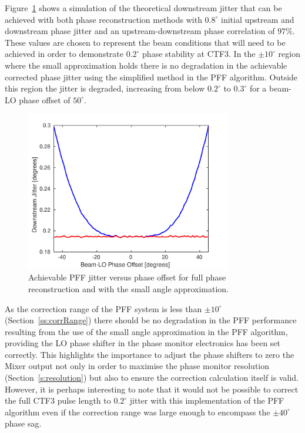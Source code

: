 Figure~\ref{f:phaseRecJitSim} shows a simulation of the theoretical downstream jitter that can be achieved with both phase reconstruction methods with \(0.8^\circ\) initial upstream and downstream phase jitter and an upstream-downstream phase correlation of \(97\%\). These values are chosen to represent the beam conditions that will need to be achieved in order to demonstrate \(0.2^\circ\) phase stability at CTF3. In the \(\pm10^\circ\) region where the small approximation holds there is no degradation in the achievable corrected phase jitter using the simplified method in the PFF algorithm. Outside this region the jitter is degraded, increasing from below \(0.2^\circ\) to \(0.3^\circ\) for a beam-LO phase offset of \(50^\circ\). 

\begin{figure}
  \centering
  \includegraphics[width=0.8\textwidth]{Figures/commissioning/phaseRecJitSim}
  \caption{Achievable PFF jitter versus phase offset for full phase reconstruction and with the small angle approximation.}
  \label{f:phaseRecJitSim}
\end{figure}

As the correction range of the PFF system is less than \(\pm10^\circ\) (Section~\ref{ss:corrRange}) there should be no degradation in the PFF performance resulting from the use of the small angle approximation in the PFF algorithm, providing the LO phase shifter in the phase monitor electronics has been set correctly. This highlights the importance to adjust the phase shifters to zero the Mixer output not only in order to maximise the phase monitor resolution (Section~\ref{s:resolution}) but also to ensure the correction calculation itself is valid. However, it is perhaps interesting to note that it would not be possible to correct the full CTF3 pulse length to \(0.2^\circ\) jitter with this implementation of the PFF algorithm even if the correction range was large enough to encompass the \(\pm40^\circ\) phase sag.

